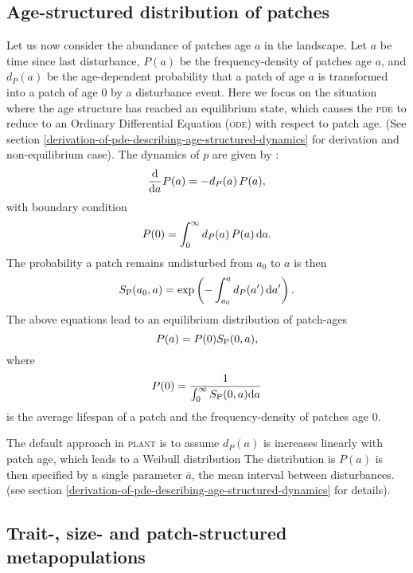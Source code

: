 \documentclass[10pt,twoside]{article}
\newcommand{\plant}{\textsc{plant}}
\begin{document}
\subsection{Age-structured distribution of
patches}\label{age-structured-distribution-of-patches}

Let us now consider the abundance of patches age \(a\) in the landscape.
Let \(a\) be time since last disturbance, \(P(a)\) be the
frequency-density of patches age \(a\), and \(d_P(a)\) be the
age-dependent probability that a patch of age \(a\) is transformed into
a patch of age 0 by a disturbance event. Here we focus on the situation
where the age structure has reached an equilibrium state, which causes
the \textsc{pde} to reduce to an Ordinary Differential Equation (\textsc{ode}) with
respect to patch age. (See section
\ref{derivation-of-pde-describing-age-structured-dynamics} for derivation and
non-equilibrium case). The dynamics of \(p\) are given by
\citep{Vonfoerster-1959, Mckendrick-1926}:
\begin{equation} \label{eq:agepde}
\frac{{\rm d}}{{\rm d} a} P(a) = - d_P(a) \, P(a) ,
\end{equation}
with boundary condition
\begin{equation}  P(0) = \int_0^\infty d_P(a) \, P(a) \, {\rm d} a.
\end{equation}
The probability a patch remains undisturbed from \(a_0\) to \(a\) is
then
\begin{equation} \label{eq:survivalPatch}
  S_{\rm P} (a_0, a) = \exp\left( - \int_{a_0}^{a} d_P(a^\prime) \, {\rm d} a^\prime \right).
\end{equation}
The above equations lead to an equilibrium distribution of patch-ages
\begin{equation} P(a) = P(0) S_{\rm P} (0, a),
\end{equation}
where
\begin{equation}
  P(0) = \frac1{\int_0^\infty S_{\rm P} (0, a) {\rm d}a}
\end{equation}
is the average lifespan of a patch and the frequency-density of patches
age \(0\).

The default approach in {\plant} is to assume  $d_P(a)$ is
increases linearly with patch age, which leads to a Weibull distribution
The distribution is $P(a)$ is then specified by a single parameter $\bar{a}$,
the mean interval between disturbances. (see section \ref{derivation-of-pde-describing-age-structured-dynamics} for details).

\subsection{Trait-, size- and patch-structured
metapopulations}\label{trait--size--and-patch-structured-metapopulations}
\end{document}

